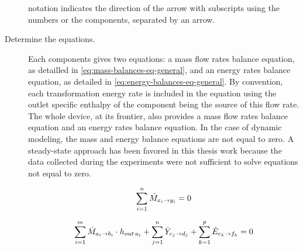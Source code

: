 \begin{description}
  notation indicates the direction of the arrow with subscripts using
  the numbers or the components, separated by an arrow.
\item[Determine the equations.] Each components gives two equations: a
  mass flow rates balance equation, as detailled in
  \cref{eq:mass-balances-eq-general}, and an energy rates balance
  equation, as detailed in \cref{eq:energy-balances-eq-general}. By
  convention, each transformation energy rate is included in the equation using the outlet
  specific enthalpy of the component being the
  source of this flow rate. The whole device, at its frontier, also
  provides a mass flow rates balance equation and an energy rates
  balance equation. In the case of dynamic modeling, the mass and
  energy balance equations are not equal to zero. A steady-state
  approach has been favored in this thesis work because the data
  collected during the experiments were not sufficient to solve
  equations not equal to zero.

\begin{equation}
  \label{eq:mass-balances-eq-general}
  \sum^n_{i=1} \dot{M}_{x_i \rightarrow y_i} = 0
  \tagaddtextone{$\left[\si{\watt}\right]$}
\end{equation}

\begin{equation}
  \label{eq:energy-balances-eq-general}
  \sum^m_{i=1} \dot{M}_{a_i \rightarrow b_i} \cdot h_{out\,a_i} +
  \sum^n_{j=1}\dot{Y}_{c_j \rightarrow d_j} +
  \sum^p_{k=1}\dot{E}_{e_k \rightarrow f_k} = 0
  \tagaddtextone{$\left[\si{\watt}\right]$}
\end{equation}


\end{description}
